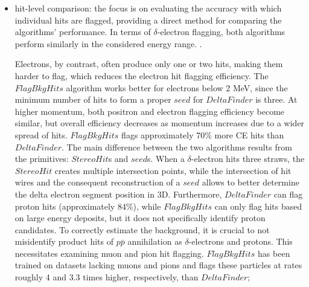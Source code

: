 \begin{itemize}
    \item hit-level comparison: the focus is on evaluating the 
    accuracy with which individual hits are flagged, providing a 
    direct method for comparing the algorithms' performance. In terms 
    of $\delta$-electron flagging, both algorithms perform similarly in the 
    considered energy range. .
  

  Electrons, by contrast, often produce only one 
    or two hits, making them harder to flag, which reduces the electron hit flagging 
    efficiency. The $FlagBkgHits$ algorithm works better for electrons below 
    2 MeV, since the minimum number of hits to form a 
    proper $seed$ for $DeltaFinder$ is three. At higher momentum, both positron and 
    electron flagging efficiency become similar, but overall efficiency 
    decreases as momentum increases due to a wider spread of hits.
    $FlagBkgHits$ flags approximately 70\% more CE hits than $DeltaFinder$.
    The main difference between the two algorithms results from  
    the primitives: $StereoHit$s and $seed$s. When a $\delta$-electron hits three 
    straws, the $StereoHit$ creates multiple intersection points, while the 
    intersection of hit wires and the consequent reconstruction of 
    a $seed$ allows to better determine the delta electron segment position in 3D. 
    Furthermore, $DeltaFinder$ can flag proton hits (approximately 84\%), while $FlagBkgHits$ 
    can only flag hits based on large energy deposits, but it does not specifically identify proton candidates.
    To correctly estimate the background, it is crucial to not misidentify 
    product hits of $p\bar{p}$ annihilation as $\delta$-electrons and protons.
    This necessitates examining muon and pion hit flagging. $FlagBkgHits$ has been trained 
    on datasets lacking muons and pions and  
    flags these particles at rates roughly 4 and 3.3 times higher, 
    respectively, than $DeltaFinder$;
    
    

\end{itemize}
